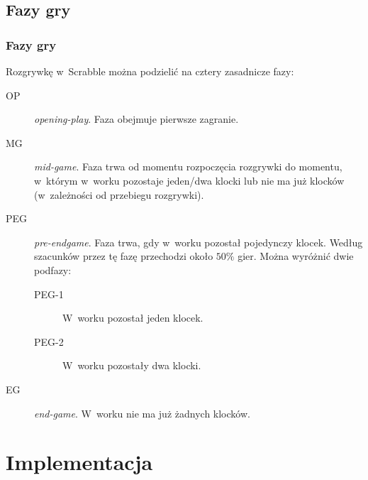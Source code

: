 \documentclass[10pt,a4paper]{beamer}
\newcounter{task}
\newlength\taskwidth%
\newlength\taskvsep%
\def\taskpos{}
\def\taskanchor{}
\newcommand\task[1]{%
  {\parbox[t]{\taskwidth}{\scriptsize\Centering#1}}}
\newcommand\Task[2][]{%
\node[inner xsep=0pt] (c1) {\phantom{A}};
\stepcounter{task}
\ifodd\thetask\relax
  \renewcommand\taskpos{\taskvsep}\renewcommand\taskanchor{south}
\else
  \renewcommand\taskpos{-\taskvsep}\renewcommand\taskanchor{north}
\fi
\node[inner,font=\footnotesize\sffamily\color{textcolor}]    
  (c\the\numexpr\value{task}+1\relax) {#1};
\node[anchor=\taskanchor,yshift=\taskpos] 
  at (c\the\numexpr\value{task}+1\relax) {\task{#2}};
}
\newcommand\drawarrow{%
\ifnum\thetask=0\relax
  \node[on chain] (c1) {}; %
\fi
\node[on chain] (f) {};
\begin{pgfonlayer}{background}
\node[
  inner sep=10pt,
  single arrow,
  single arrow head extend=0.8cm,
  draw=none,
  fill=arrowcolor,
  fit= (c1) (f)
] (arrow) {};
\fill[white] %
  (arrow.before tail) -- (c1|-arrow.west) -- (arrow.after tail) -- cycle;
\end{pgfonlayer}
}
\newenvironment{timeline}[1][node distance=.75\taskwidth]
  {\par\noindent\begin{tikzpicture}[start chain,#1]}
  {\drawarrow\end{tikzpicture}\par}
\begin{document}
\subsection{Fazy gry}

\begin{frame}
	\frametitle{Fazy gry}
	
	Rozgrywkę w~Scrabble można podzielić na cztery zasadnicze fazy:

	\begin{description}
		\item[OP] \emph{opening-play}. Faza obejmuje pierwsze zagranie.
		\item[MG] \emph{mid-game}. Faza trwa od momentu rozpoczęcia rozgrywki do momentu, w~którym w~worku pozostaje jeden/dwa klocki lub nie ma już klocków (w~zależności od przebiegu rozgrywki).
		\item[PEG] \emph{pre-endgame}. Faza trwa, gdy w~worku pozostał pojedynczy klocek. Według szacunków przez tę fazę przechodzi około $50\%$ gier. Można wyróżnić dwie podfazy:
			\begin{description}
				\item[PEG-1] W~worku pozostał jeden klocek.
				\item[PEG-2] W~worku pozostały dwa klocki.
			\end{description}
		\item[EG] \emph{end-game}. W~worku nie ma już żadnych klocków.
	\end{description}
\end{frame}

\captionsetup[figure]{skip=10pt}


\section{Implementacja}
\end{document}
